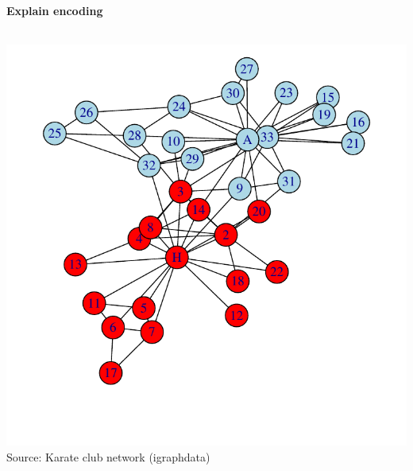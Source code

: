 \documentclass[8pt]{beamer}
\begin{document}
\begin{frame}
\frametitle{\insertsection}
\framesubtitle{Explain encoding}

\begin{columns}[t]
\centering
\includegraphics[width=0.9\linewidth]{karate_nl}\\
\tiny Source: Karate club network (igraphdata) \cite{Zachary1977}


\centering
{}

\end{columns}

\end{frame}
\end{document}
